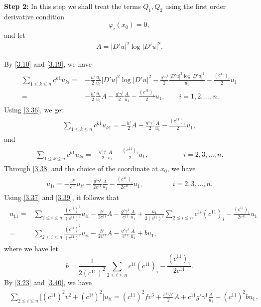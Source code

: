 \documentclass[11pt]{amsart}
\numberwithin{equation}{section}
\begin{document}
{\bf Step 2:} In this step we shall treat the terms $Q_1, Q_2$ using the first order derivative condition
 $$\varphi_i(x_0)=0,$$
  and let
  \begin{align}\label{3.35a}
A=|D'u|^2\log|D'u|^2.
\end{align}

By \eqref{3.10}  and  \eqref{3.19},  we have
\begin{align}\label{3.36}
\begin{split}
\sum_{1\leq k\leq n}c^{k1}u_{ki}=&-\frac{h'}{2}\frac{u_i}{u_1}|D'u|^2\log|D'u|^2-\frac{g'\gamma^i}{2}\frac{|D'u|^2\log|D'u|^2}{u_1}-\frac{(c^{11})_i}{2} u_1\\
=&-\frac{h'}{2}\frac{u_i}{u_1}A-\frac{g'\gamma^i}{2}\frac{A}{u_1}-\frac{(c^{11})_i}{2} u_1,\qquad i=1,2,\ldots,n.
\end{split}
\end{align}
Using \eqref{3.36},  we get
\begin{align}\label{3.37}
\begin{split}
\sum_{1\leq k\leq n} c^{k1}u_{k1}
=-\frac{h'}{2} A-\frac{g'\gamma^1}{2}\frac{A}{u_1}-\frac{(c^{11})_1}{2} u_1,
\end{split}
\end{align}
and
\begin{align}\label{3.38}
\begin{split}
\sum_{1\leq k\leq n} c^{k1}u_{ki}
=-\frac{g'\gamma^i}{2}\frac{A}{u_1}-\frac{(c^{11})_i}{2} u_1,
 \qquad\qquad\quad i=2,3,\ldots,n.
\end{split}
\end{align}
Through \eqref{3.38}  and the choice of the coordinate at $x_0$, we have
\begin{align}\label{3.39}
\begin{split}
u_{1i}
=-\frac{c^{1i}}{c^{11}}u_{ii}-\frac{g'\gamma^i}{2c^{11}}\frac{A}{u_1}-\frac{(c^{11})_i}{2c^{11}} u_1,\quad\quad
\ \qquad i=2,3,\ldots,n.
\end{split}
\end{align}
Using \eqref{3.37}  and \eqref{3.39},  it follows that
\begin{align}\label{3.40}
\begin{split}
u_{11}
=&\sum_{2\leq i\leq n}\frac{(c^{1i})^2}{(c^{11})^2}u_{ii}-\frac{h'}{2c^{11}} A-\frac{g'\gamma^1}{c^{11}}\frac{A}{u_1}
+\frac{u_1}{2(c^{11})^2}\sum_{2\leq i\leq n}c^{1i}(c^{11})_i-\frac{(c^{11})_1}{2c^{11}}u_1\\
=&\sum_{2\leq i\leq n}\frac{(c^{1i})^2}{(c^{11})^2}u_{ii}-\frac{h'}{2c^{11}} A-\frac{g'\gamma^1}{c^{11}}\frac{A}{u_1}+bu_1,
\end{split}
\end{align}
 where we have let $$b=\frac{1}{2(c^{11})^2}\sum_{2\leq i\leq n}c^{1i}(c^{11})_i-\frac{(c^{11})_1}{2c^{11}}.$$
By \eqref{3.23}  and \eqref{3.40},  we have
\begin{align}\label{3.41}
\begin{split}
\sum_{2\leq i\leq n}\big[(c^{11})^2v^2+(c^{1i})^2\big]u_{ii}
=(c^{11})^2f v^3+\frac{c^{11}h'}{2} A+c^{11}g'\gamma^1\frac{A}{u_1}-(c^{11})^2bu_1.
\end{split}
\end{align}
\end{document}
